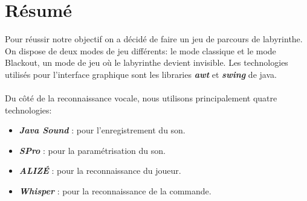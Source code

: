 \section{Résumé}
\label{sec:resume}

Pour réussir notre objectif on a décidé de faire un jeu de parcours de labyrinthe. On dispose de deux modes de jeu différents: le mode classique et le mode Blackout,
un mode de jeu où le labyrinthe devient invisible. Les technologies utilisés pour l'interface graphique sont les libraries \textbf{\textit{awt}} et \textbf{\textit{swing}} de java. \\\\
Du côté de la reconnaissance vocale, nous utilisons principalement quatre technologies:
\begin{itemize}
    \item \textbf{\textit{Java Sound}} : pour l'enregistrement du son.
    \item \textbf{\textit{SPro}} : pour la paramétrisation du son.
    \item \textbf{\textit{ALIZÉ}} : pour la reconnaissance du joueur.
    \item \textbf{\textit{Whisper}} : pour la reconnaissance de la commande.
\end{itemize}

